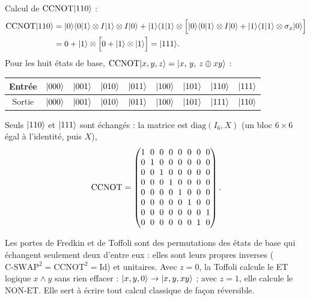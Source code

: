 Calcul de $\mathrm{CCNOT}|110\rangle$ :
\begin{align*}
  \mathrm{CCNOT}|110\rangle&=|0\rangle\langle 0|1\rangle\otimes I|1\rangle\otimes I|0\rangle
     +|1\rangle\langle 1|1\rangle\otimes\Big[|0\rangle\langle 0|1\rangle\otimes I|0\rangle
       +|1\rangle\langle 1|1\rangle\otimes\sigma_x|0\rangle\Big]\\
  &=0+|1\rangle\otimes\Big[0+|1\rangle\otimes|1\rangle\Big]=|111\rangle.
\end{align*}
Pour les huit états de base, $\mathrm{CCNOT}|x,y,z\rangle=|x,\,y,\,z\oplus xy\rangle$ :
\begin{center}
\renewcommand{\arraystretch}{1.3}
\begin{tabular}{@{}ccccccccc@{}}
\toprule
Entrée & $|000\rangle$ & $|001\rangle$ & $|010\rangle$ & $|011\rangle$ & $|100\rangle$ & $|101\rangle$ & $|110\rangle$ & $|111\rangle$ \\
\midrule
Sortie & $|000\rangle$ & $|001\rangle$ & $|010\rangle$ & $|011\rangle$ & $|100\rangle$ & $|101\rangle$ & $|111\rangle$ & $|110\rangle$ \\
\bottomrule
\end{tabular}
\end{center}
Seuls $|110\rangle$ et $|111\rangle$ sont échangés : la matrice est $\mathrm{diag}(I_6,X)$
(un bloc $6\times6$ égal à l'identité, puis $X$),
\[
  \mathrm{CCNOT}=\begingroup\setlength{\arraycolsep}{3pt}\begin{pmatrix}
    1&0&0&0&0&0&0&0\\
    0&1&0&0&0&0&0&0\\
    0&0&1&0&0&0&0&0\\
    0&0&0&1&0&0&0&0\\
    0&0&0&0&1&0&0&0\\
    0&0&0&0&0&1&0&0\\
    0&0&0&0&0&0&0&1\\
    0&0&0&0&0&0&1&0
  \end{pmatrix}\endgroup .
\]

\begin{remarque}
Les portes de Fredkin et de Toffoli sont des permutations des états de base qui échangent
seulement deux d'entre eux : elles sont leurs propres inverses ($\mathrm{C\text{-}SWAP}^2=\mathrm{CCNOT}^2=\mathrm{Id}$)
et unitaires. Avec $z=0$, la Toffoli calcule le ET logique $x\wedge y$ sans rien effacer :
$|x,y,0\rangle\to|x,y,xy\rangle$ ; avec $z=1$, elle calcule le NON-ET. Elle sert à écrire tout calcul
classique de façon réversible.
\end{remarque}

